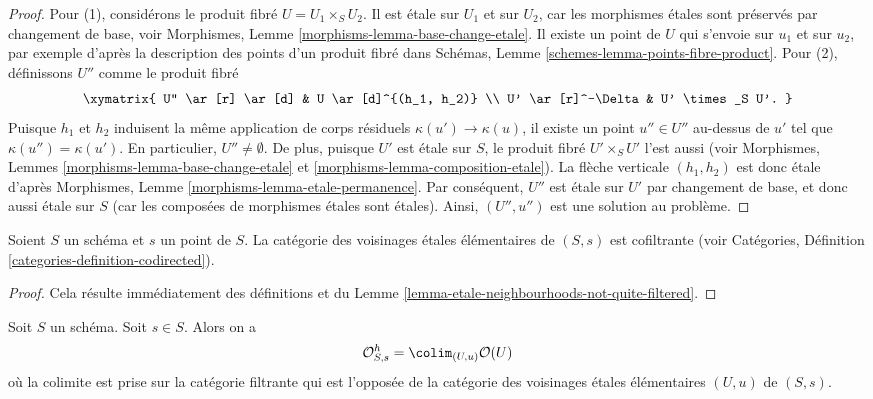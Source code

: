 \begin{proof}
Pour (1), considérons le produit fibré $U = U_1 \times_S U_2$.
Il est \'etale sur $U_1$ et sur $U_2$, car les morphismes \'etales sont
préservés par changement de base, voir
Morphismes, Lemme \ref{morphisms-lemma-base-change-etale}.
Il existe un point de $U$ qui s'envoie sur $u_1$ et sur $u_2$, par exemple
d'après la description des points d'un produit fibré dans
Schémas, Lemme \ref{schemes-lemma-points-fibre-product}.
Pour (2), définissons $U''$ comme le produit fibré
$$
\xymatrix{
U'' \ar[r] \ar[d] & U \ar[d]^{(h_1, h_2)} \\
U' \ar[r]^-\Delta & U' \times_S U'.
}
$$
Puisque $h_1$ et $h_2$ induisent la même application de corps résiduels
$\kappa(u') \to \kappa(u)$, il existe un point $u'' \in U''$
au-dessus de $u'$ tel que $\kappa(u'') = \kappa(u')$.
En particulier, $U'' \not = \emptyset$.
De plus, puisque $U'$ est \'etale sur $S$, le produit fibré
$U'\times_S U'$ l'est aussi (voir
Morphismes, Lemmes \ref{morphisms-lemma-base-change-etale} et
\ref{morphisms-lemma-composition-etale}).
La flèche verticale $(h_1, h_2)$ est donc \'etale d'après
Morphismes, Lemme \ref{morphisms-lemma-etale-permanence}.
Par conséquent, $U''$ est \'etale sur $U'$ par changement de base, et donc aussi
\'etale sur $S$ (car les composées de morphismes \'etales sont \'etales).
Ainsi, $(U'', u'')$ est une solution au problème.
\end{proof}

\begin{lemma}
\label{lemma-elementary-etale-neighbourhoods}
Soient $S$ un schéma et $s$ un point de $S$.
La catégorie des voisinages \'etales élémentaires de $(S, s)$
est cofiltrante (voir
Catégories, Définition \ref{categories-definition-codirected}).
\end{lemma}

\begin{proof}
Cela résulte immédiatement des définitions et du
Lemme \ref{lemma-etale-neighbourhoods-not-quite-filtered}.
\end{proof}

\begin{lemma}
\label{lemma-describe-henselization}
Soit $S$ un schéma. Soit $s \in S$. Alors on a
$$
\mathcal{O}_{S, s}^h =
\colim_{(U, u)} \mathcal{O}(U)
$$
où la colimite est prise sur la catégorie filtrante qui est l'opposée de la
catégorie des voisinages \'etales élémentaires $(U, u)$ de $(S, s)$.
\end{lemma}

